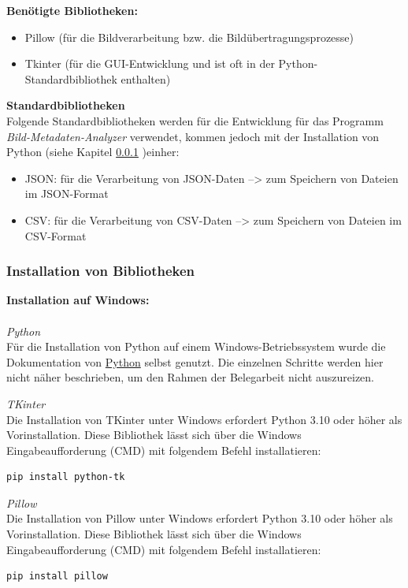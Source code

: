 \documentclass{Bild-Metadaten-Analyzer}
\begin{document}
\textbf{Benötigte Bibliotheken:}
\begin{itemize}
	\item Pillow (für die Bildverarbeitung bzw. die Bildübertragungsprozesse)
	\item Tkinter (für die GUI-Entwicklung und ist oft in der Python-Standardbibliothek enthalten)
\end{itemize}

\textbf{Standardbibliotheken}\\
Folgende Standardbibliotheken werden für die Entwicklung für das Programm \textit{Bild-Metadaten-Analyzer} verwendet, kommen 
jedoch mit der Installation von Python (siehe Kapitel \ref{subsubsec:Installation von Bibliotheken} )einher:
\begin{itemize}
	\item JSON: für die Verarbeitung von JSON-Daten --> zum Speichern von Dateien im JSON-Format
	\item CSV: für die Verarbeitung von CSV-Daten --> zum Speichern von Dateien im CSV-Format
\end{itemize}
\subsubsection{Installation von Bibliotheken}\label{subsubsec:Installation von Bibliotheken}

\textbf{Installation auf Windows:}\\
\\\textit{Python}\\
Für die Installation von Python auf einem Windows-Betriebssystem wurde die Dokumentation von 
\href{https://docs.python.org/3.10//using/windows.html}{Python} selbst genutzt. Die einzelnen Schritte werden hier nicht näher 
beschrieben, um den Rahmen der Belegarbeit nicht auszureizen.

\textit{TKinter}\\
Die Installation von TKinter unter Windows erfordert Python 3.10 oder höher als Vorinstallation. Diese Bibliothek lässt sich über 
die Windows Eingabeaufforderung (CMD) mit folgendem Befehl installatieren:
\begin{lstlisting}[style=pythonstyle]
pip install python-tk
\end{lstlisting}

\textit{Pillow}\\
Die Installation von Pillow unter Windows erfordert Python 3.10 oder höher als Vorinstallation. Diese Bibliothek lässt sich über 
die Windows Eingabeaufforderung (CMD) mit folgendem Befehl installatieren:
\begin{lstlisting}[style=pythonstyle]
pip install pillow
\end{lstlisting}
\end{document}
